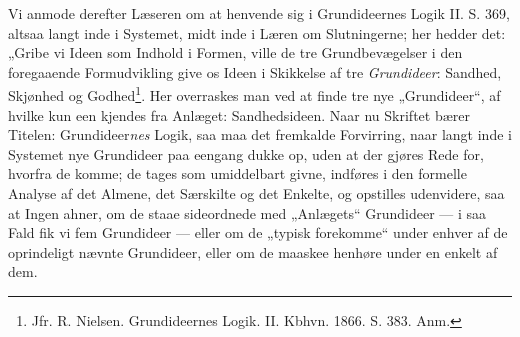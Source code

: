 \documentclass[12pt,a4paper]{book}
\newcommand{\opage}[1]{\marginnote{\footnotesize\textit{[#1]}}}
\begin{document}
Vi anmode derefter Læseren om at henvende sig i
\opage{41}\setcounter{footnote}{0}%
Grundideernes Logik II. S. 369, altsaa langt inde i
Systemet, midt inde i Læren om Slutningerne; her hedder
det: „Gribe vi Ideen som Indhold i Formen, ville
de tre Grundbevægelser i den foregaaende Formudvikling
give os Ideen i Skikkelse af tre \emph{Grundideer}: Sandhed,
Skjønhed og Godhed\footnote{Jfr. R. Nielsen. Grundideernes Logik. II. Kbhvn. 1866.
S. 383. Anm.}. Her overraskes man ved at
finde tre nye „Grundideer“, af hvilke kun een kjendes fra
Anlæget: Sandhedsideen. Naar nu Skriftet bærer Titelen:
Grundideer\emph{nes} Logik, saa maa det fremkalde
Forvirring, naar langt inde i Systemet nye Grundideer
paa eengang dukke op, uden at der gjøres Rede for,
hvorfra de komme; de tages som umiddelbart givne, indføres
i den formelle Analyse af det Almene, det Særskilte og
det Enkelte, og opstilles udenvidere, saa at Ingen ahner,
om de staae sideordnede med „Anlægets“ Grundideer ---
i saa Fald fik vi fem Grundideer --- eller om de „typisk
forekomme“ under enhver af de oprindeligt nævnte Grundideer,
eller om de maaskee henhøre under en enkelt
af dem.
\end{document}
